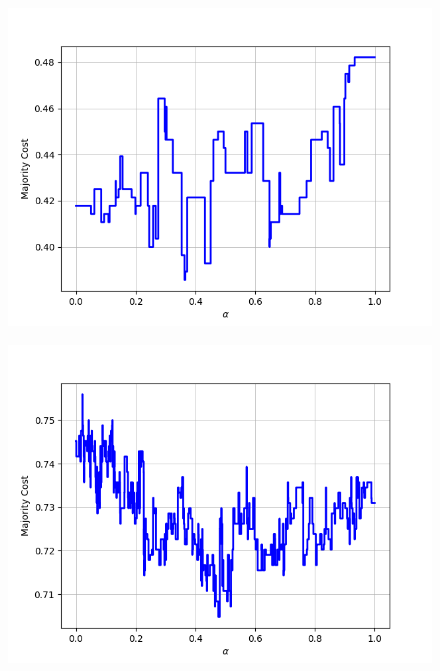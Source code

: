 \begin{figure}[H]
\begin{minipage}{.24\textwidth}
  {\includegraphics[width=\linewidth]{plots/omniglot-intra-ac-cnn/N_Ko}}
\end{minipage}
\begin{minipage}{.24\textwidth}
  \centering
  {\includegraphics[width=\linewidth]{plots/omniglot-intra-ac-cnn/Ojibwe_(Canadian_Aboriginal_Syllabics)}}
\end{minipage}
\begin{minipage}{.24\textwidth}
  \centering

\end{minipage}
\end{figure}
